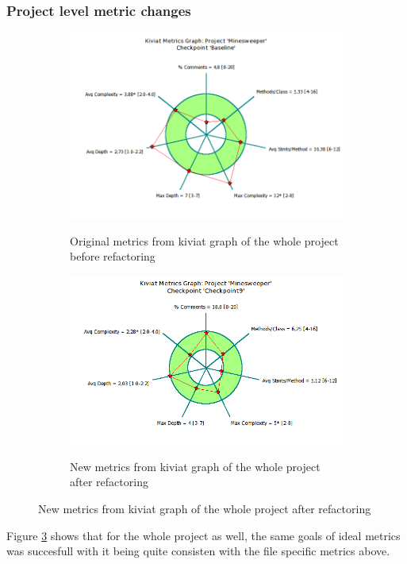 \documentclass[UKenglish]{article}  %
\begin{document}
\subsubsection{Project level metric changes}

\begin{figure}[h]
	\begin{subfigure}[b]{0.5\textwidth}
		\caption{Original metrics from kiviat graph of the whole project before refactoring}
		\includegraphics[width=\textwidth]{project-kiviat-metrics-graph-original.png}
		\label{project_original}
	\end{subfigure}
	\begin{subfigure}[b]{0.5\textwidth}
		\caption{New metrics from kiviat graph of the whole project after refactoring}
		\includegraphics[width=\textwidth]{project-kiviat-metrics-graph-final.png}
		\label{project_final}
	\end{subfigure}
\end{figure}

Figure \ref{project_final} shows that for the whole project as well, the same
goals of ideal metrics was succesfull with it being quite consisten with the
file specific metrics above.
\end{document}

